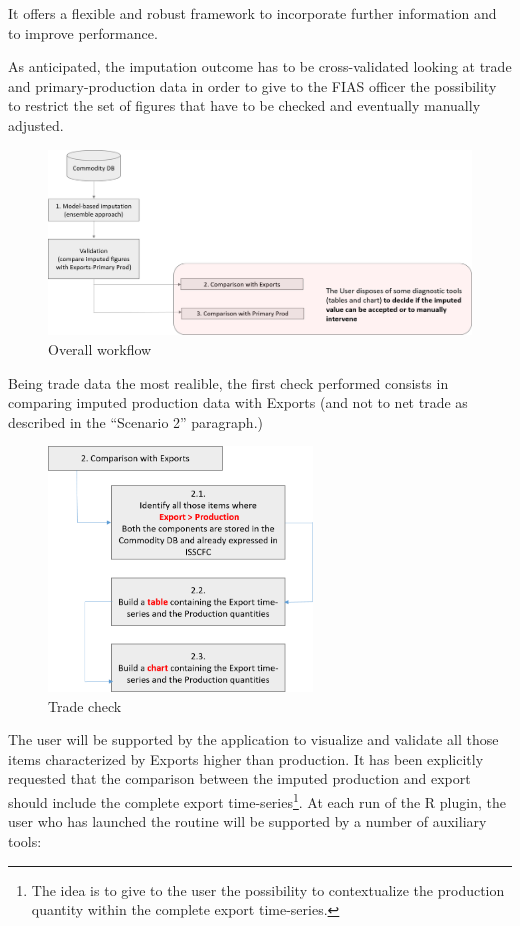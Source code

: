 \documentclass[nojss]{jss}
\begin{document}
It offers a flexible and robust framework to incorporate further information and to improve performance.

As anticipated, the imputation outcome has to be cross-validated looking at trade and primary-production data in order to give to the FIAS officer the possibility to restrict the set of figures that have to be checked and eventually manually adjusted.


\begin{figure}
\includegraphics{plot/moduleWorkFlow.png}
\caption{Overall workflow}
\end{figure}

Being trade data the most realible, the first check performed consists in comparing imputed production data with Exports (and not to net trade as described in the ``Scenario 2'' paragraph.)

\begin{figure}
\includegraphics[height=6.5cm,width=5.85 cm]{plot/tradeCheck}
\caption{Trade check}
\end{figure}

The user will be supported by the application to visualize and validate all those items characterized by Exports higher than production. It has been explicitly requested that the comparison between the imputed production and export should include the complete export time-series\footnote{The idea is to give to the user the possibility to contextualize the production quantity within the complete export time-series.}.
At each run of the R plugin, the user who has launched the routine will be supported by a number of auxiliary tools:
\end{document}
